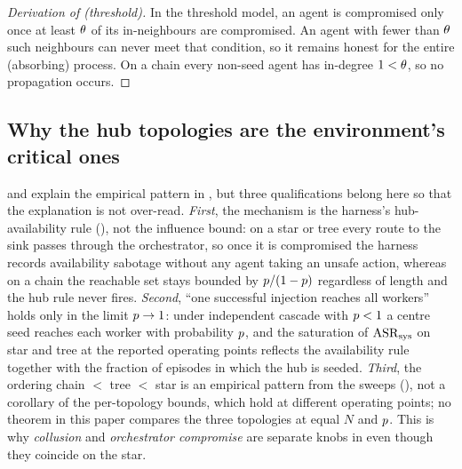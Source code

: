 \begin{proof}[Derivation of  (threshold)]
In the threshold model, an agent is compromised only once at least $\theta$ of its
in-neighbours are compromised. An agent with fewer than $\theta$ such neighbours can never
meet that condition, so it remains honest for the entire (absorbing) process. On a chain
every non-seed agent has in-degree $1<\theta$, so no propagation occurs.
\end{proof}

\subsection{Why the hub topologies are the environment's critical ones}

 and  explain the empirical pattern in
, but three qualifications belong here so that the explanation is not
over-read. \emph{First}, the mechanism is the harness's hub-availability rule
(), not the influence bound: on a star or tree every route to the sink
passes through the orchestrator, so once it is compromised the harness records availability
sabotage without any agent taking an unsafe action, whereas on a chain the reachable set
stays bounded by $p/(1-p)$ regardless of length and the hub rule never fires.
\emph{Second}, ``one successful injection reaches all workers'' holds only in the limit
$p\to1$: under independent cascade with $p<1$ a centre seed reaches each worker with
probability $p$, and the saturation of $\mathrm{ASR}_{\mathrm{sys}}$ on star and tree at the reported
operating points reflects the availability rule together with the fraction of episodes in
which the hub is seeded. \emph{Third}, the ordering chain $<$ tree $<$ star is an empirical
pattern from the sweeps (), not a corollary of
the per-topology bounds, which hold at different operating points; no theorem in this paper
compares the three topologies at equal $N$ and $p$. This is why \emph{collusion} and
\emph{orchestrator compromise} are separate knobs in  even though they
coincide on the star.